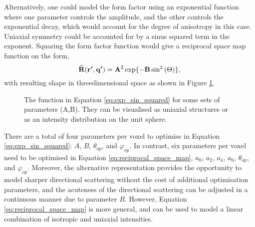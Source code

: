 Alternatively, one could model the form factor using an exponential function where one parameter controls the amplitude, and the other controls the exponential decay,
which would account for the degree of anisotropy in this case. Uniaxial symmetry could be accounted for by a sinus squared term in the exponent.
Squaring the form factor function would give a reciprocal space map function on the form,
\begin{equation}\label{eq:exp_sin_squared}
    \vectorBU{\widehat{R}}(\vectorBU{r'}, \vectorBU{q'}) = \vectorBU{A}^{2} \exp\{-\vectorBU{B} \sin^{2}\left( \vectorgreek{\Theta} \right) \}, %
\end{equation}
with resulting shape in threedimensional space as shown in Figure \ref{fig:exp_sin_squared}.

\begin{figure}
    \centering
    \caption[Illustration of Alternative Functional]{The function in Equation \eqref{eq:exp_sin_squared} for some sets of parameters (A,B).
        They can be visualised as uniaxial structures or as an intensity distribution on the unit sphere.}
    \label{fig:exp_sin_squared}
\end{figure}

There are a total of four parameters per voxel to optimise in Equation \eqref{eq:exp_sin_squared}: $A$, $B$, $\theta_{op}$, and $\varphi_{op}$.
In contrast, six parameters per voxel need to be optimised in Equation \eqref{eq:reciprocal_space_map},
$a_{0}$, $a_{2}$, $a_{4}$, $a_{6}$, $\theta_{op}$, and $\varphi_{op}$.
Moreover, the alternative representation provides the opportunity to model sharper directional scattering without the cost of additional optimisation parameters,
and the acuteness of the directional scattering can be adjusted in a continuous manner due to parameter $B$.
However, Equation \eqref{eq:reciprocal_space_map} is more general, and can be used to model a linear combination of isotropic and uniaxial intensities.


